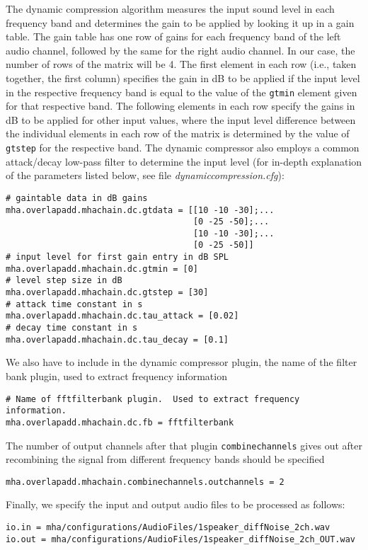 %
The dynamic compression algorithm measures the input sound level in 
each frequency band and determines the gain to be applied by looking 
it up in a gain table. The gain table has one row of gains for each 
frequency band of the left audio channel, followed by the same for 
the right audio channel. In our case, the number of rows of the 
matrix will be 4.
%
The first element in each row (i.e., taken together, the first
column) specifies the gain in dB to be applied if the input level in
the respective frequency band is equal to the value of the \verb!gtmin!
element given for that respective band.
%
The following elements in each row specify the gains in dB to be
applied for other input values, where the input level difference
between the individual elements in each row of the matrix is
determined by the value of \verb!gtstep! for the respective 
band. The dynamic compressor also employs a common attack/decay low-pass filter
to determine the input level (for in-depth explanation of the parameters 
listed below, see file \emph{dynamiccompression.cfg}):
\begin{verbatim}
# gaintable data in dB gains
mha.overlapadd.mhachain.dc.gtdata = [[10 -10 -30];...
                                     [0 -25 -50];...
                                     [10 -10 -30];...
                                     [0 -25 -50]]
# input level for first gain entry in dB SPL
mha.overlapadd.mhachain.dc.gtmin = [0]
# level step size in dB
mha.overlapadd.mhachain.dc.gtstep = [30]
# attack time constant in s
mha.overlapadd.mhachain.dc.tau_attack = [0.02]
# decay time constant in s
mha.overlapadd.mhachain.dc.tau_decay = [0.1]
\end{verbatim}
%
We also have to include in the dynamic compressor plugin, the name 
of the filter bank plugin, used to extract frequency information
\begin{verbatim}
# Name of fftfilterbank plugin.  Used to extract frequency information.
mha.overlapadd.mhachain.dc.fb = fftfilterbank
\end{verbatim}
%
The number of output channels after that plugin \verb!combinechannels! 
gives out after recombining the signal from different frequency 
bands should be specified
\begin{verbatim}
mha.overlapadd.mhachain.combinechannels.outchannels = 2
\end{verbatim}
%
Finally, we specify the input and output audio files to be processed as 
follows:
\begin{verbatim}
io.in = mha/configurations/AudioFiles/1speaker_diffNoise_2ch.wav
io.out = mha/configurations/AudioFiles/1speaker_diffNoise_2ch_OUT.wav
\end{verbatim}
